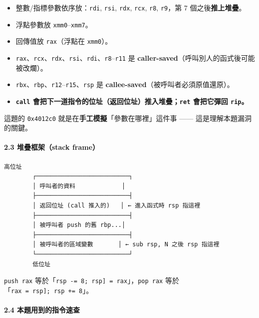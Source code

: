 \documentclass[10pt,a4paper]{article}
\providecommand{\tightlist}{%
  \setlength{\itemsep}{0pt}\setlength{\parskip}{0pt}}
\begin{document}
\begin{itemize}
\tightlist
\item
  整數/指標參數依序放：\texttt{rdi}, \texttt{rsi}, \texttt{rdx},
  \texttt{rcx}, \texttt{r8}, \texttt{r9}，第 7 個之後\textbf{推上堆疊}。
\item
  浮點參數放 \texttt{xmm0}--\texttt{xmm7}。
\item
  回傳值放 \texttt{rax}（浮點在 \texttt{xmm0}）。
\item
  \texttt{rax}、\texttt{rcx}、\texttt{rdx}、\texttt{rsi}、\texttt{rdi}、\texttt{r8}--\texttt{r11}
  是 \textbf{caller-saved}（呼叫別人的函式後可能被改爛）。
\item
  \texttt{rbx}、\texttt{rbp}、\texttt{r12}--\texttt{r15}、\texttt{rsp}
  是 \textbf{callee-saved}（被呼叫者必須原值還原）。
\item
  \textbf{\texttt{call}
  會把下一道指令的位址（返回位址）推入堆疊；\texttt{ret} 會把它彈回
  \texttt{rip}。}
\end{itemize}

這題的 \texttt{0x4012c0} 就是在\textbf{手工模擬}「參數在哪裡」這件事
------ 這是理解本題漏洞的關鍵。

\paragraph{2.3 堆疊框架（stack
frame）}\label{ux5806ux758aux6846ux67b6stack-frame}

\begin{Verbatim}[breaklines=true,breakanywhere=true,breakautoindent=false,fontsize=\fontsize{7.0}{9.5}\selectfont]
        高位址
        ┌──────────────────────────┐
        │ 呼叫者的資料             │
        ├──────────────────────────┤
        │ 返回位址 (call 推入的)   │ ← 進入函式時 rsp 指這裡
        ├──────────────────────────┤
        │ 被呼叫者 push 的舊 rbp...│
        ├──────────────────────────┤
        │ 被呼叫者的區域變數       │ ← sub rsp, N 之後 rsp 指這裡
        └──────────────────────────┘
        低位址
\end{Verbatim}

\texttt{push\ \allowbreak{}rax}
等於「\texttt{rsp\ \allowbreak{}-=\ \allowbreak{}8;\ \allowbreak{}{[}rsp{]}\ \allowbreak{}=\ \allowbreak{}rax}」，\texttt{pop\ \allowbreak{}rax}
等於「\texttt{rax\ \allowbreak{}=\ \allowbreak{}{[}rsp{]};\ \allowbreak{}rsp\ \allowbreak{}+=\ \allowbreak{}8}」。

\paragraph{2.4
本題用到的指令速查}\label{ux672cux984cux7528ux5230ux7684ux6307ux4ee4ux901fux67e5}
\end{document}
